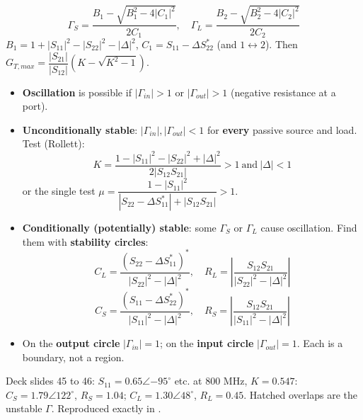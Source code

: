 {\begin{itemize}
    \[ \Gamma_S = \frac{B_1 - \sqrt{B_1^2 - 4|C_1|^2}}{2C_1}, \quad
       \Gamma_L = \frac{B_2 - \sqrt{B_2^2 - 4|C_2|^2}}{2C_2} \]
    $B_1 = 1 + |S_{11}|^2 - |S_{22}|^2 - |\Delta|^2$, $C_1 = S_{11} - \Delta S_{22}^*$ (and
    $1 \leftrightarrow 2$). Then
    $G_{T,max} = \dfrac{|S_{21}|}{|S_{12}|}\left(K - \sqrt{K^2 - 1}\right)$.
\end{itemize}}{%
\begin{itemize}
  \item \textbf{Oscillation} is possible if $|\Gamma_{in}| > 1$ or $|\Gamma_{out}| > 1$
    (negative resistance at a port).
  \item \textbf{Unconditionally stable}: $|\Gamma_{in}|, |\Gamma_{out}| < 1$ for
    \textbf{every} passive source and load. Test (Rollett):
    \[ K = \frac{1 - |S_{11}|^2 - |S_{22}|^2 + |\Delta|^2}{2|S_{12}S_{21}|} > 1
       \ \text{and}\ |\Delta| < 1 \]
    or the single test $\mu = \dfrac{1 - |S_{11}|^2}{|S_{22} - \Delta S_{11}^*| + |S_{12}S_{21}|} > 1$.
  \item \textbf{Conditionally (potentially) stable}: some $\Gamma_S$ or $\Gamma_L$ cause
    oscillation. Find them with \textbf{stability circles}:
    \[ C_L = \frac{(S_{22} - \Delta S_{11}^*)^*}{|S_{22}|^2 - |\Delta|^2}, \quad
       R_L = \left|\frac{S_{12}S_{21}}{|S_{22}|^2 - |\Delta|^2}\right| \]
    \[ C_S = \frac{(S_{11} - \Delta S_{22}^*)^*}{|S_{11}|^2 - |\Delta|^2}, \quad
       R_S = \left|\frac{S_{12}S_{21}}{|S_{11}|^2 - |\Delta|^2}\right| \]
  \item On the \textbf{output circle} $|\Gamma_{in}| = 1$; on the \textbf{input circle}
    $|\Gamma_{out}| = 1$. Each is a boundary, not a region.
\end{itemize}
{\color{sub}\scriptsize Deck slides 45 to 46: $S_{11} = 0.65\angle{-95^\circ}$ etc. at 800 MHz,
$K = 0.547$: $C_S = 1.79\angle122^\circ$, $R_S = 1.04$; $C_L = 1.30\angle48^\circ$,
$R_L = 0.45$. Hatched overlaps are the unstable $\Gamma$. Reproduced exactly in
.}}

